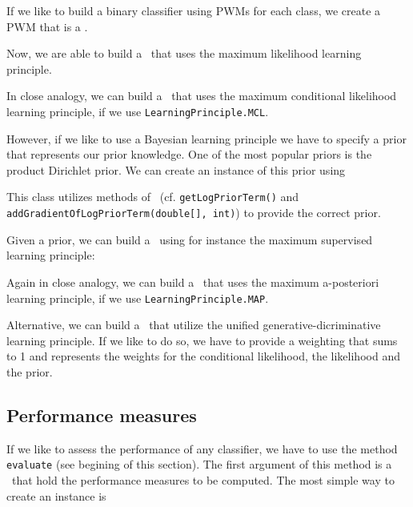 If we like to build a binary classifier using PWMs for each class, we create a PWM that is a \DiffSM.

\addtocounter{off}{3}

Now, we are able to build a \GenDisMixClassifier~that uses the maximum likelihood learning principle.

\addtocounter{off}{3}

In close analogy, we can build a \GenDisMixClassifier~that uses the maximum conditional likelihood learning principle, if we use \lstinline+LearningPrinciple.MCL+.

However, if we like to use a Bayesian learning principle we have to specify a prior that represents our prior knowledge. One of the most popular priors is the product Dirichlet prior. We can create an instance of this prior using

\addtocounter{off}{3}

This class utilizes methods of \DiffSM~(cf. \lstinline+getLogPriorTerm()+ and \lstinline+addGradientOfLogPriorTerm(double[], int)+) to provide the correct prior.

Given a prior, we can build a \GenDisMixClassifier~using for instance the maximum supervised learning principle:

\addtocounter{off}{3}

Again in close analogy, we can build a \GenDisMixClassifier~that uses the maximum a-posteriori learning principle, if we use \lstinline+LearningPrinciple.MAP+.
 
Alternative, we can build a \GenDisMixClassifier~that utilize the unified generative-dicriminative learning principle. If we like to do so, we have to provide a weighting that sums to 1 and represents the weights for the conditional likelihood, the likelihood and the prior.

\addtocounter{off}{3}

\subsection{Performance measures}\label{Performance}

If we like to assess the performance of any classifier, we have to use the method \lstinline+evaluate+ (see begining of this section). The first argument of this method is a \PerformanceMeasureParameterSet~that hold the performance measures to be computed. The most simple way to create an instance is

\addtocounter{off}{9}

